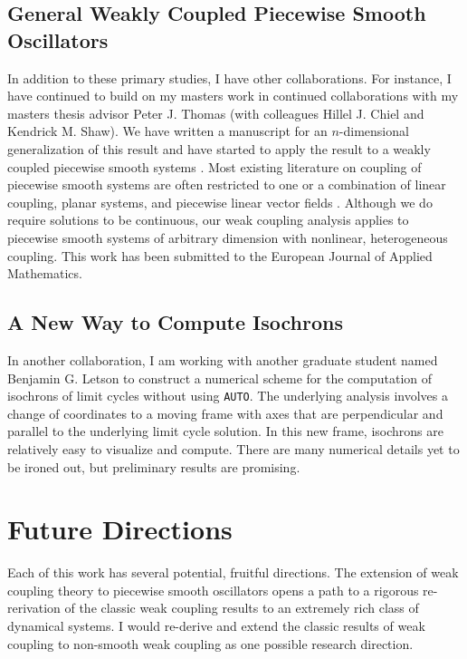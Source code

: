 \documentclass[a4paper,11pt]{article}
\begin{document}
\subsection{General Weakly Coupled Piecewise Smooth Oscillators}
In addition to these primary studies, I have other collaborations. For instance, I have continued to build on my masters work in continued collaborations with my masters thesis advisor Peter J. Thomas (with colleagues Hillel J. Chiel and Kendrick M. Shaw). We have written a manuscript for an $n$-dimensional generalization of this result and have started to apply the result to a weakly coupled piecewise smooth systems \cite{park2016infinitesimal}. Most existing literature on coupling of piecewise smooth systems are often restricted to one or a combination of linear coupling, planar systems, and piecewise linear vector fields \cite{coombes2016synchrony,izhikevich2000phase,coombes2012nonsmooth}. Although we do require solutions to be continuous, our weak coupling analysis applies to piecewise smooth systems of arbitrary dimension with nonlinear, heterogeneous coupling. This work has been submitted to the European Journal of Applied Mathematics.

\subsection{A New Way to Compute Isochrons}
In another collaboration, I am working with another graduate student named Benjamin G. Letson to construct a numerical scheme for the computation of isochrons of limit cycles without using \texttt{AUTO}. The underlying analysis involves a change of coordinates to a moving frame with axes that are perpendicular and parallel to the underlying limit cycle solution. In this new frame, isochrons are relatively easy to visualize and compute. There are many numerical details yet to be ironed out, but preliminary results are promising.

\section{Future Directions}
Each of this work has several potential, fruitful directions. The extension of weak coupling theory to piecewise smooth oscillators opens a path to a rigorous re-rerivation of the classic weak coupling results to an extremely rich class of dynamical systems. I would re-derive and extend the classic results of weak coupling to non-smooth weak coupling as one possible research direction.
\end{document}
